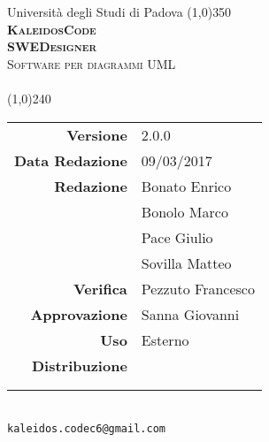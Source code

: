 \documentclass[a4paper,12pt]{article}
\author{KaleidosCode}
\date{09/03/2017}	%
\begin{document}
	\begin{titlepage}
		\centering Università degli Studi di Padova
		\line(1,0){350}\\
		\vspace{0.4cm}
		{\bfseries\scshape\LARGE KaleidosCode\\}
		\vspace{0.4cm}
		{\bfseries\scshape\LARGE SWEDesigner\\}
		{\scshape\Large Software per diagrammi UML\\}
		\vspace{1cm}
		{\scshape\Large \pianodiqualificai\ \\}		%
		\vspace{1.4cm}
		\logo
		\vspace{1.2cm}
		\line(1,0){240}\\
		\begin{tabular}{r|l}
			{\hfill \textbf{Versione}} 			& 2.0.0\\
			{\hfill \textbf{Data Redazione}} 	& 09/03/2017\\	%
			{\hfill \textbf{Redazione}} 		& Bonato Enrico\\ & Bonolo Marco\\ & Pace Giulio\\ & Sovilla Matteo\\
			{\hfill \textbf{Verifica}} 			& Pezzuto Francesco\\
			{\hfill \textbf{Approvazione}} 		& Sanna Giovanni\\
			{\hfill \textbf{Uso}} 				& Esterno\\
			{\hfill \textbf{Distribuzione}} 	& \vardanega \\ & \cardin \\ & \proponente\\
		\end{tabular}\\
		\vspace{2cm}
		\texttt{kaleidos.codec6@gmail.com}
	\end{titlepage}
	
	\pagestyle{myfront}
	\newpage
	
	\newpage
	\tableofcontents
	\newpage
	\listoftables
	\newpage
	\listoffigures
	\newpage
	\pagestyle{mymain}
	
	\newpage
	
	\newpage
	
	\newpage
	
	\newpage
	
	\appendix
	\newpage
	
	\label{LastPage}
\end{document}
